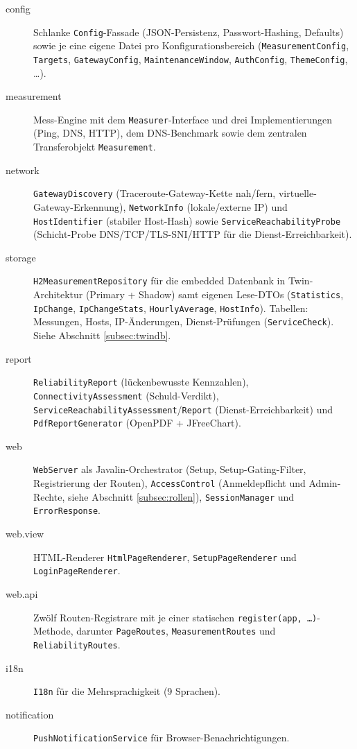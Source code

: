 \begin{description}
  \item[config] Schlanke \texttt{Config}-Fassade (JSON-Persistenz, Passwort-Hashing,
    Defaults) sowie je eine eigene Datei pro Konfigurationsbereich (\texttt{MeasurementConfig},
    \texttt{Targets}, \texttt{GatewayConfig}, \texttt{MaintenanceWindow}, \texttt{AuthConfig},
    \texttt{ThemeConfig}, \dots).
  \item[measurement] Mess-Engine mit dem \texttt{Measurer}-Interface und drei
    Implementierungen (Ping, DNS, HTTP), dem DNS-Benchmark sowie dem zentralen
    Transferobjekt \texttt{Measurement}.
  \item[network] \texttt{GatewayDiscovery} (Traceroute-Gateway-Kette nah/fern,
    virtuelle-Gateway-Erkennung), \texttt{NetworkInfo} (lokale/externe IP) und
    \texttt{HostIdentifier} (stabiler Host-Hash) sowie \texttt{ServiceReachabilityProbe}
    (Schicht-Probe DNS/TCP/TLS-SNI/HTTP für die Dienst-Erreichbarkeit).
  \item[storage] \texttt{H2MeasurementRepository} für die embedded Datenbank in
    Twin-Architektur (Primary + Shadow) samt eigenen Lese-DTOs (\texttt{Statistics},
    \texttt{IpChange}, \texttt{IpChangeStats}, \texttt{HourlyAverage}, \texttt{HostInfo}).
    Tabellen: Messungen, Hosts, IP-Änderungen, Dienst-Prüfungen (\texttt{ServiceCheck}).
    Siehe Abschnitt \ref{subsec:twindb}.
  \item[report] \texttt{ReliabilityReport} (lückenbewusste Kennzahlen),
    \texttt{ConnectivityAssessment} (Schuld-Verdikt), \texttt{ServiceReachabilityAssessment}/\texttt{Report}
    (Dienst-Erreichbarkeit) und \texttt{PdfReportGenerator} (OpenPDF + JFreeChart).
  \item[web] \texttt{WebServer} als Javalin-Orchestrator (Setup, Setup-Gating-Filter,
    Registrierung der Routen), \texttt{AccessControl} (Anmeldepflicht und Admin-Rechte,
    siehe Abschnitt \ref{subsec:rollen}), \texttt{SessionManager} und \texttt{ErrorResponse}.
  \item[web.view] HTML-Renderer \texttt{HtmlPageRenderer}, \texttt{SetupPageRenderer} und
    \texttt{LoginPageRenderer}.
  \item[web.api] Zwölf Routen-Registrare mit je einer statischen
    \texttt{register(app, \dots)}-Methode, darunter \texttt{PageRoutes},
    \texttt{MeasurementRoutes} und \texttt{ReliabilityRoutes}.
  \item[i18n] \texttt{I18n} für die Mehrsprachigkeit (9 Sprachen).
  \item[notification] \texttt{PushNotificationService} für Browser-Benachrichtigungen.
\end{description}

